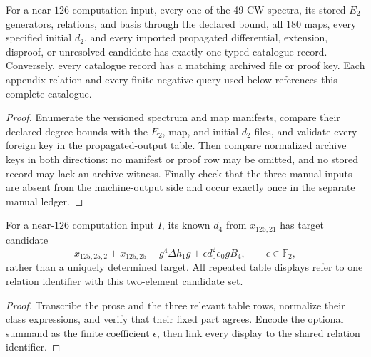 \begin{theorem}
  \label{thm:lin-computation-catalogues-complete}
  \notready
  For a near-$126$ computation input, every one of the 49 CW spectra, its stored
  $E_2$ generators, relations, and basis through the declared bound, all 180
  maps, every specified initial $d_2$, and every imported propagated
  differential, extension, disproof, or unresolved candidate has exactly one
  typed catalogue record.  Conversely, every catalogue record has a matching
  archived file or proof key.  Each appendix relation and every finite negative
  query used below references this complete catalogue.
\end{theorem}

\begin{proof}
  Enumerate the versioned spectrum and map manifests, compare their declared
  degree bounds with the $E_2$, map, and initial-$d_2$ files, and validate every
  foreign key in the propagated-output table.  Then compare normalized archive
  keys in both directions: no manifest or proof row may be omitted, and no
  stored record may lack an archive witness.  Finally check that the three
  manual inputs are absent from the machine-output side and occur exactly once
  in the separate manual ledger.
\end{proof}

\begin{proposition}
  \label{prop:x12621-ambiguity}
  \notready
  For a near-$126$ computation input $I$, its known $d_4$ from $x_{126,21}$ has
  target candidate
  \[
    x_{125,25,2}+x_{125,25}+g^4\Delta h_1g
      +\epsilon d_0^2e_0gB_4,
    \qquad \epsilon\in\mathbb F_2,
  \]
  rather than a uniquely determined target.  All repeated table displays
  refer to one relation identifier with this two-element candidate set.
\end{proposition}

\begin{proof}
  Transcribe the prose and the three relevant table rows, normalize their class
  expressions, and verify that their fixed part agrees.  Encode the optional
  summand as the finite coefficient $\epsilon$, then link every display to the
  shared relation identifier.
\end{proof}

